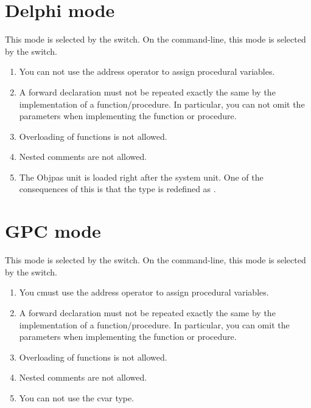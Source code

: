 \documentclass{report}
\begin{document}
\section{Delphi mode}
This mode is selected by the  switch. On the command-line,
this mode is selected by the  switch.
\begin{enumerate}
\item You can not use the address operator to assign procedural variables.
\item A forward declaration must not be repeated exactly the same by the
implementation of a function/procedure. In particular, you can not omit the
parameters when implementing the function or procedure.
\item Overloading of functions is not allowed.
\item Nested comments are not  allowed.
\item The Objpas unit is loaded right after the system unit. One of the
consequences of this is that the type  is redefined as
.
\end{enumerate}
\section{GPC mode}
This mode is selected by the  switch. On the command-line,
this mode is selected by the  switch.
\begin{enumerate}
\item You cmust use the address operator to assign procedural variables.
\item A forward declaration must not be repeated exactly the same by the
implementation of a function/procedure. In particular, you can omit the
parameters when implementing the function or procedure.
\item Overloading of functions is not allowed.
\item Nested comments are not allowed.
\item You can not use the cvar type.
\end{enumerate}
\end{document}

